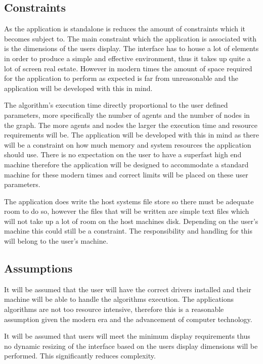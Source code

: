 \documentclass[10pt,a4paper]{article}
\begin{document}
\subsection{Constraints}

As the application is standalone is reduces the amount of constraints which it becomes subject to. The main constraint which the application is associated with is the dimensions of the users display. The interface has to house a lot of elements in order to produce a simple and effective environment, thus it takes up quite a lot of screen real estate. However in modern times the amount of space required for the application to perform as expected is far from unreasonable and the application will be developed with this in mind.

The algorithm’s execution time directly proportional to the user defined parameters, more specifically the number of agents and the number of nodes in the graph. The more agents and nodes the larger the execution time and resource requirements will be. The application will be developed with this in mind as there will be a constraint on how much memory and system resources the application should use. There is no expectation on the user to have a superfast high end machine therefore the application will be designed to accommodate a standard machine for these modern times and correct limits will be placed on these user parameters.

The application does write the host systems file store so there must be adequate room to do so, however the files that will be written are simple text files which will not take up a lot of room on the host machines disk. Depending on the user’s machine this could still be a constraint. The responsibility and handling for this will belong to the user’s machine.

\subsection{Assumptions}

It will be assumed that the user will have the correct drivers installed and their machine will be able to handle the algorithms execution. The applications algorithms are not too resource intensive, therefore this is a reasonable assumption given the modern era and the advancement of computer technology.

It will be assumed that users will meet the minimum display requirements thus no dynamic resizing of the interface based on the users display dimensions will be performed. This significantly reduces complexity.
\end{document}
